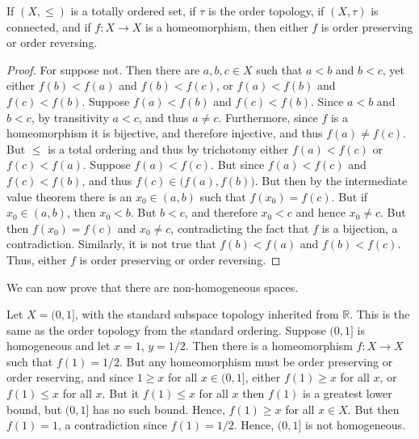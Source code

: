         \begin{theorem}
                If $(X,\leq)$ is a totally ordered set, if $\tau$ is the order
                topology, if $(X,\tau)$ is connected, and if $f:X\rightarrow{X}$
                is a homeomorphism, then either $f$ is order preserving or
                order reversing.
        \end{theorem}
        \begin{proof}
                For suppose not. Then there are $a,b,c\in{X}$ such that
                $a<b$ and $b<c$, yet either $f(b)<f(a)$ and $f(b)<f(c)$, or
                $f(a)<f(b)$ and $f(c)<f(b)$. Suppose $f(a)<f(b)$ and
                $f(c)<f(b)$. Since $a<b$ and $b<c$, by transitivity $a<c$, and
                thus $a\ne{c}$. Furthermore, since $f$ is a homeomorphism it is
                bijective, and therefore injective, and thus $f(a)\ne{f}(c)$.
                But $\leq$ is a total ordering and thus by trichotomy either
                $f(a)<f(c)$ or $f(c)<f(a)$. Suppose $f(a)<f(c)$. But since
                $f(a)<f(c)$ and $f(c)<f(b)$, and thus
                $f(c)\in\big(f(a),f(b)\big)$. But then by the intermediate value
                theorem there is an $x_{0}\in(a,b)$ such that $f(x_{0})=f(c)$.
                But if $x_{0}\in(a,b)$, then $x_{0}<b$. But $b<c$, and therefore
                $x_{0}<c$ and hence $x_{0}\ne{c}$. But then $f(x_{0})=f(c)$ and
                $x_{0}\ne{c}$, contradicting the fact that $f$ is a bijection,
                a contradiction. Similarly, it is not true that $f(b)<f(a)$ and
                $f(b)<f(c)$. Thus, either $f$ is order preserving or order
                reversing.
        \end{proof}
        We can now prove that there are non-homogeneous spaces.
        \begin{example}
                Let $X=(0,1]$, with the standard subspace topology inherited
                from $\mathbb{R}$. This is the same as the order topology from
                the standard ordering. Suppose $(0,1]$ is homogeneous and let
                $x=1$, $y=1/2$. Then there is a homeomorphism
                $f:X\rightarrow{X}$ such that $f(1)=1/2$. But any homeomorphism
                must be order preserving or order reserving, and since
                $1\geq{x}$ for all $x\in(0,1]$, either $f(1)\geq{x}$ for all
                $x$, or $f(1)\leq{x}$ for all $x$. But it $f(1)\leq{x}$ for all
                $x$ then $f(1)$ is a greatest lower bound, but $(0,1]$ has no
                such bound. Hence, $f(1)\geq{x}$ for all $x\in{X}$. But then
                $f(1)=1$, a contradiction since $f(1)=1/2$. Hence, $(0,1]$ is
                not homogeneous.
        \end{example}
